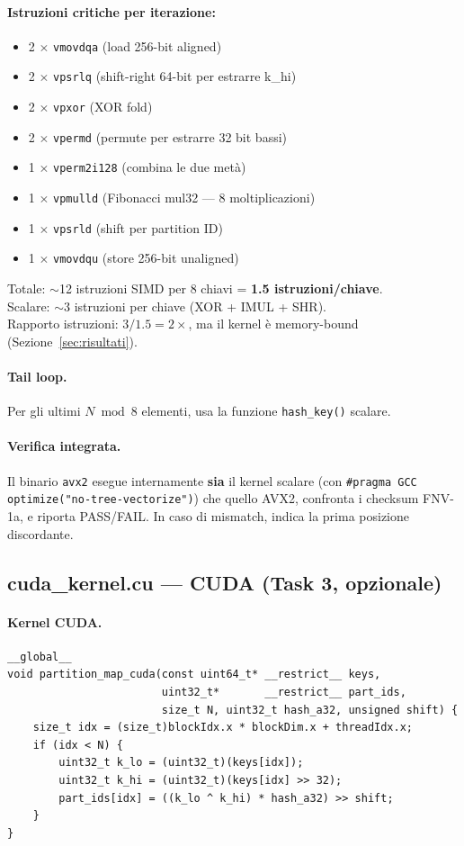 \documentclass[11pt,a4paper]{article}
\begin{document}
\paragraph{Istruzioni critiche per iterazione:}
\begin{itemize}
    \item 2 $\times$ \texttt{vmovdqa} (load 256-bit aligned)
    \item 2 $\times$ \texttt{vpsrlq} (shift-right 64-bit per estrarre k\_hi)
    \item 2 $\times$ \texttt{vpxor} (XOR fold)
    \item 2 $\times$ \texttt{vpermd} (permute per estrarre 32 bit bassi)
    \item 1 $\times$ \texttt{vperm2i128} (combina le due metà)
    \item 1 $\times$ \texttt{vpmulld} (Fibonacci mul32 --- 8 moltiplicazioni)
    \item 1 $\times$ \texttt{vpsrld} (shift per partition ID)
    \item 1 $\times$ \texttt{vmovdqu} (store 256-bit unaligned)
\end{itemize}
Totale: $\sim$12 istruzioni SIMD per 8 chiavi = \textbf{1.5 istruzioni/chiave}.\\
Scalare: $\sim$3 istruzioni per chiave (XOR + IMUL + SHR).\\
Rapporto istruzioni: $3/1.5 = 2\times$, ma il kernel è memory-bound (Sezione~\ref{sec:risultati}).

\paragraph{Tail loop.} Per gli ultimi $N \bmod 8$ elementi, usa la funzione \texttt{hash\_key()} scalare.

\paragraph{Verifica integrata.} Il binario \texttt{avx2} esegue internamente \textbf{sia} il kernel scalare (con \texttt{\#pragma GCC optimize("no-tree-vectorize")}) che quello AVX2, confronta i checksum FNV-1a, e riporta PASS/FAIL. In caso di mismatch, indica la prima posizione discordante.


\subsection{cuda\_kernel.cu --- CUDA (Task 3, opzionale)}

\paragraph{Kernel CUDA.}
\begin{lstlisting}
__global__
void partition_map_cuda(const uint64_t* __restrict__ keys,
                        uint32_t*       __restrict__ part_ids,
                        size_t N, uint32_t hash_a32, unsigned shift) {
    size_t idx = (size_t)blockIdx.x * blockDim.x + threadIdx.x;
    if (idx < N) {
        uint32_t k_lo = (uint32_t)(keys[idx]);
        uint32_t k_hi = (uint32_t)(keys[idx] >> 32);
        part_ids[idx] = ((k_lo ^ k_hi) * hash_a32) >> shift;
    }
}
\end{lstlisting}
\end{document}
